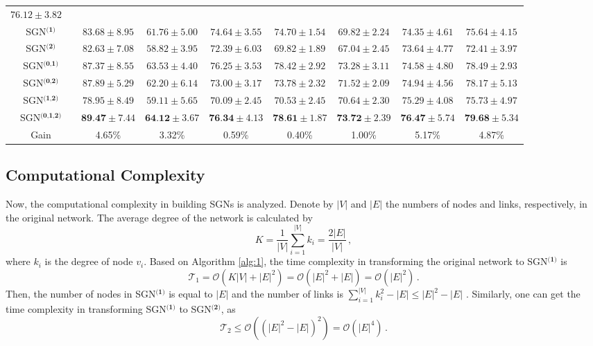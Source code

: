 \documentclass[10pt,journal,compsoc]{IEEEtran}
\begin{document}
\begin{table*}[!t]
\begin{tabular}{c|cccccccc}
$76.12\pm{3.82}$\\
\multicolumn{2}{c|}{SGN$^{\textbf{(1)}}$}&$83.68\pm{8.95}$&  $61.76\pm{5.00}$&  $74.64\pm{3.55}$&  $74.70\pm{1.54}$&  $69.82\pm{2.24}$&  $74.35\pm{4.61}$&
$75.64\pm{4.15}$\\
\multicolumn{2}{c|}{SGN$^{\textbf{(2)}}$}&$82.63\pm{7.08}$&  $58.82\pm{3.95}$&  $72.39\pm{6.03}$& $69.82\pm{1.89}$&  $67.04\pm{2.45}$&  $73.64\pm{4.77}$&
$72.41\pm{3.97}$\\
\multicolumn{2}{c|}{SGN$^{\textbf{(0,1)}}$}&$87.37\pm{8.55}$&  $63.53\pm{4.40}$&  $76.25\pm{3.53}$&  $78.42\pm{2.92}$&  $73.28\pm{3.11}$&  $74.58\pm{4.80}$&
$78.49\pm{2.93}$\\
\multicolumn{2}{c|}{SGN$^{\textbf{(0,2)}}$}&$87.89\pm{5.29}$&  $62.20\pm{6.14}$&  $73.00\pm{3.17}$& $73.78\pm{2.32}$&  $71.52\pm{2.09}$&  $74.94\pm{4.56}$&
$78.17\pm{5.13}$\\
\multicolumn{2}{c|}{SGN$^{\textbf{(1,2)}}$}&$78.95\pm{8.49}$&  $59.11\pm{5.65}$&  $70.09\pm{2.45}$&  $70.53\pm{2.45}$&  $70.64\pm{2.30}$&  $75.29\pm{4.08}$&
$75.73\pm{4.97}$\\
\multicolumn{2}{c|}{SGN$^{\textbf{(0,1,2)}}$}&$\textbf{89.47}\pm{7.44}$& $\textbf{64.12}\pm{3.67}$&  $\textbf{76.34}\pm{4.13}$&  $\textbf{78.61}\pm{1.87}$& $\textbf{73.72}\pm{2.39}$&  $\textbf{76.47}\pm{5.74}$&
$\textbf{79.68}\pm{5.34}$\\
\hline
\multicolumn{2}{c|}{Gain}&4.65\%& 3.32\%&  0.59\%&  0.40\%&  1.00\%&  5.17\%&  4.87\%\\

\hline\hline
\end{tabular}
\label{Table2}
\end{table*}

\subsection{Computational Complexity}
Now, the computational complexity in building SGNs is analyzed. Denote by $|V|$ and $|E|$ the numbers of nodes and links, respectively, in the original network. The average degree of the network is calculated by
\begin{equation}
K=\frac{1}{|V|}\sum_{i=1}^{|V|}k_i=\frac{2|E|}{|V|}\,,
\end{equation}
where $k_i$ is the degree of node $v_i$. Based on Algorithm \ref{alg:1}, the time complexity in transforming the original network to SGN$^{\textbf{(1)}}$ is
\begin{equation}
\mathcal{T}_1=\mathcal{O}(K|V|+|E|^2)=\mathcal{O}(|E|^2+|E|) = \mathcal{O}(|E|^2)\,.
\end{equation}
Then, the number of nodes in SGN$^{\textbf{(1)}}$ is equal to $|E|$ and the number of links is $\sum_{i=1}^{|V|}k_i^2-|E|\leq|E|^2-|E|$ \cite{harary1960some}. Similarly, one can get the time complexity in transforming SGN$^{\textbf{(1)}}$ to SGN$^{\textbf{(2)}}$, as
\begin{equation}
\mathcal{T}_2 \leq \mathcal{O}((|E|^2-|E|)^2) = \mathcal{O}(|E|^4)\,.
\end{equation}
\end{document}
